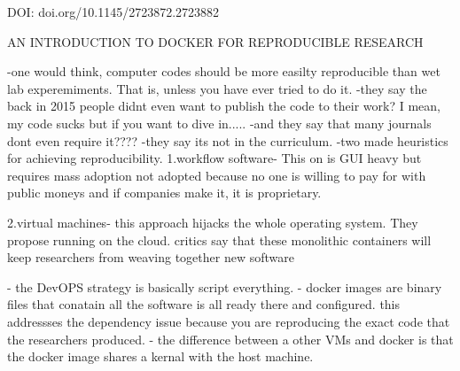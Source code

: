 DOI: doi.org/10.1145/2723872.2723882

    AN INTRODUCTION TO DOCKER FOR REPRODUCIBLE RESEARCH

    -one would think, computer codes should be more easilty reproducible than
    wet lab experemiments. That is, unless you have ever tried to do it. 
    -they say the back in 2015 people didnt even want to publish the code to their work?
    I mean, my code sucks but if you want to dive in.....
    -and they say that many journals dont even require it????
    -they say its not in the curriculum. 
    -two made heuristics for achieving reproducibility. 
        1.workflow software- This on is GUI heavy but requires mass adoption
        not adopted because no one is willing to pay for with public moneys
        and if companies make it, it is proprietary. 

        2.virtual machines- this approach hijacks the whole operating system. They propose
        running on the cloud. critics say that these monolithic containers will keep researchers
        from weaving together new software

    - the DevOPS strategy is basically script everything. 
    - docker images are binary files that conatain all the software is all ready there and
    configured. this addressses the dependency issue because you are reproducing the 
    exact code that the researchers produced.
    - the difference between a other VMs and docker is that the docker image shares a kernal 
    with the host machine. 

